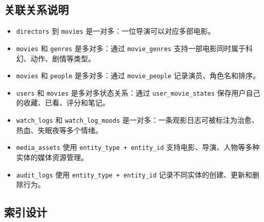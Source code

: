 \documentclass[
]{ctexart}
\providecommand{\tightlist}{%
  \setlength{\itemsep}{0pt}\setlength{\parskip}{0pt}}
\begin{document}
\hypertarget{ux5173ux8054ux5173ux7cfbux8bf4ux660e}{%
\subsection{关联关系说明}\label{ux5173ux8054ux5173ux7cfbux8bf4ux660e}}

\begin{itemize}
\tightlist
\item
  \texttt{directors} 到 \texttt{movies}
  是一对多：一位导演可以对应多部电影。
\item
  \texttt{movies} 和 \texttt{genres} 是多对多：通过
  \texttt{movie\_genres} 支持一部电影同时属于科幻、动作、剧情等类型。
\item
  \texttt{movies} 和 \texttt{people} 是多对多：通过
  \texttt{movie\_people} 记录演员、角色名和排序。
\item
  \texttt{users} 和 \texttt{movies} 是多对多状态关系：通过
  \texttt{user\_movie\_states} 保存用户自己的收藏、已看、评分和笔记。
\item
  \texttt{watch\_logs} 和 \texttt{watch\_log\_moods}
  是一对多：一条观影日志可被标注为治愈、热血、失眠夜等多个情绪。
\item
  \texttt{media\_assets} 使用 \texttt{entity\_type\ +\ entity\_id}
  支持电影、导演、人物等多种实体的媒体资源管理。
\item
  \texttt{audit\_logs} 使用 \texttt{entity\_type\ +\ entity\_id}
  记录不同实体的创建、更新和删除行为。
\end{itemize}

\hypertarget{ux7d22ux5f15ux8bbeux8ba1}{%
\subsection{索引设计}\label{ux7d22ux5f15ux8bbeux8ba1}}
\end{document}
